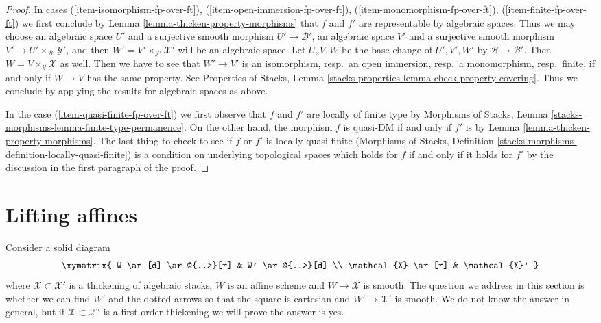 \begin{proof}
\medskip\noindent
In cases (\ref{item-isomorphism-fp-over-ft}),
(\ref{item-open-immersion-fp-over-ft}),
(\ref{item-monomorphism-fp-over-ft}),
(\ref{item-finite-fp-over-ft})
we first conclude by Lemma \ref{lemma-thicken-property-morphisms}
that $f$ and $f'$ are representable by algebraic spaces. Thus we may choose
an algebraic space $U'$ and a surjective smooth morphism
$U' \to \mathcal{B}'$,
an algebraic space $V'$ and a surjective smooth morphism
$V' \to U' \times_{\mathcal{B}'} \mathcal{Y}'$, and then
$W' = V' \times_{\mathcal{Y}'} \mathcal{X}'$ will be an algebraic space.
Let $U, V, W$ be the base change of
$U', V', W'$ by $\mathcal{B} \to \mathcal{B}'$.
Then $W = V \times_\mathcal{Y} \mathcal{X}$ as well.
Then we have to see that $W' \to V'$ is an
isomorphism, resp.\ an open immersion, resp.\ a monomorphism,
resp.\ finite, if and only if $W \to V$ has the same property.
See Properties of Stacks, Lemma
\ref{stacks-properties-lemma-check-property-covering}.
Thus we conclude by applying the results
for algebraic spaces as above.

\medskip\noindent
In the case (\ref{item-quasi-finite-fp-over-ft}) we first
observe that $f$ and $f'$ are locally of finite type by
Morphisms of Stacks, Lemma \ref{stacks-morphisms-lemma-finite-type-permanence}.
On the other hand, the morphism $f$ is quasi-DM if and only if
$f'$ is by
Lemma \ref{lemma-thicken-property-morphisms}.
The last thing to check to see if $f$ or $f'$ is locally quasi-finite
(Morphisms of Stacks, Definition
\ref{stacks-morphisms-definition-locally-quasi-finite})
is a condition on underlying topological spaces
which holds for $f$ if and only if it holds for $f'$ by
the discussion in the first paragraph of the proof.
\end{proof}









\section{Lifting affines}
\label{section-lifting-affines}

\noindent
Consider a solid diagram
$$
\xymatrix{
W \ar[d] \ar@{..>}[r] & W' \ar@{..>}[d] \\
\mathcal{X} \ar[r] & \mathcal{X}'
}
$$
where $\mathcal{X} \subset \mathcal{X}'$ is a thickening of algebraic stacks,
$W$ is an affine scheme and $W \to \mathcal{X}$ is smooth. The question
we address in this section is whether we can find $W'$ and the dotted
arrows so that the square is cartesian and $W' \to \mathcal{X}'$ is smooth.
We do not know the answer in general, but if $\mathcal{X} \subset \mathcal{X}'$
is a first order thickening we will prove the answer is yes.

